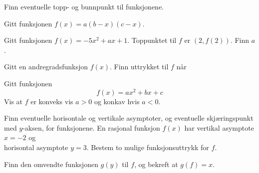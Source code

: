 





\opgt

\nes

Finn eventuelle topp- og bunnpunkt til funksjonene. \os
{}

Gitt funksjonen 
$ f(x)=a(b-x)(c-x) $. \os
{} 

Gitt funksjonen $f(x)={-5x^2+ax+1}$. Toppunktet til $f$ er $(2, f(2))$. Finn $a$.

Gitt en andregradsfunksjon $ f(x) $. Finn uttrykket til $ f $ når
 \vs

Gitt funksjonen
\[ f(x)=ax^2+bx+c \]
Vis at $f$ er konveks vis $a>0$ og konkav hvis $a<0$.

\nes
{}
Finn eventuelle horisontale og vertikale asymptoter, og eventuelle skjæringspunkt med $ y $-aksen, for funksjonene. \os
{} \os
{}
\newpage
{}
En rasjonal funksjon $f(x)$ har vertikal asymptote $x=-2$ og \\horisontal asymptote $y=3$. \os
Bestem to mulige funksjonsuttrykk for $f$.


\nes

Finn den omvendte funksjonen $ g(y) $ til $ f $, og bekreft at $ g(f)=x $. \os
{} \os
{} \os
{}

